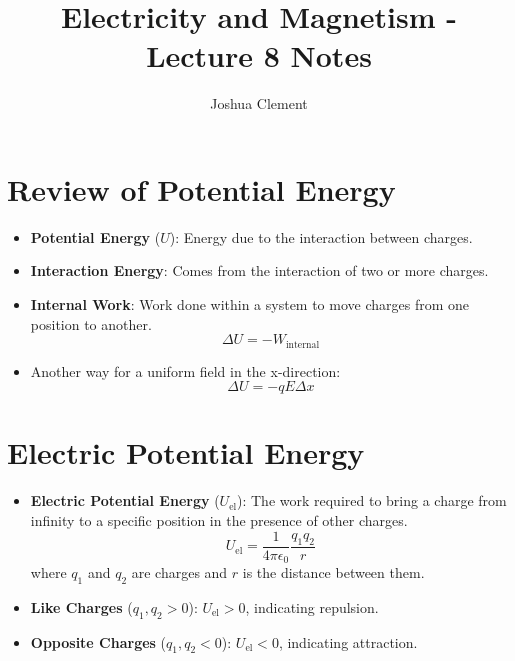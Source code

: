 \documentclass{article}
\begin{document}
\title{Electricity and Magnetism - Lecture 8 Notes}
\author{Joshua Clement}
\maketitle

\section*{Review of Potential Energy}
\begin{itemize}
    \item \textbf{Potential Energy} (\(U\)): Energy due to the interaction between charges.
    \item \textbf{Interaction Energy}: Comes from the interaction of two or more charges.
    \item \textbf{Internal Work}: Work done within a system to move charges from one position to another.
    \[
        \Delta U = -W_{\text{internal}}
    \]
    \item Another way for a uniform field in the x-direction:
    \[
        \Delta U = -qE \Delta x
    \]
\end{itemize}

\section*{Electric Potential Energy}
\begin{itemize}
    \item \textbf{Electric Potential Energy} (\(U_{\text{el}}\)): The work required to bring a charge from infinity to a specific position in the presence of other charges.
    \[
    U_{\text{el}} = \frac{1}{4 \pi \epsilon_0} \frac{q_1 q_2}{r}
    \]
    where \(q_1\) and \(q_2\) are charges and \(r\) is the distance between them.
    \item \textbf{Like Charges} (\(q_1, q_2 > 0\)): \(U_{\text{el}} > 0\), indicating repulsion.
    \item \textbf{Opposite Charges} (\(q_1, q_2 < 0\)): \(U_{\text{el}} < 0\), indicating attraction.
\end{itemize}
\end{document}
